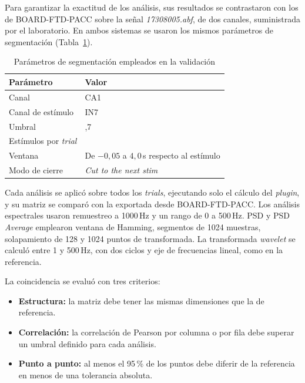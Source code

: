 \documentclass[12pt,letterpaper,oneside]{article}
\begin{document}
Para garantizar la exactitud de los análisis, sus resultados se contrastaron con los de BOARD-FTD-PACC sobre la señal \textit{17308005.abf}, de dos canales, suministrada por el laboratorio. En ambos sistemas se usaron los mismos parámetros de segmentación (Tabla~\ref{tab:pruebas_segmentacion}).

\begin{table}[H]
\centering
\scriptsize
\renewcommand{\arraystretch}{1.3}
\begin{tabularx}{\textwidth}{|l|>{\raggedright\arraybackslash}X|}
\hline
\textbf{Parámetro} & \textbf{Valor} \\
\hline
Canal & CA1 \\
\hline
Canal de estímulo & IN7 \\
\hline
Umbral & 0,7 \\
\hline
Estímulos por \textit{trial} & 1 \\
\hline
Ventana & De $-0{,}05$ a $4{,}0$\,s respecto al estímulo \\
\hline
Modo de cierre & \textit{Cut to the next stim} \\
\hline
\end{tabularx}
\caption{Parámetros de segmentación empleados en la validación}
\label{tab:pruebas_segmentacion}
\end{table}

Cada análisis se aplicó sobre todos los \textit{trials}, ejecutando solo el cálculo del \textit{plugin}, y su matriz se comparó con la exportada desde BOARD-FTD-PACC. Los análisis espectrales usaron remuestreo a 1000\,Hz y un rango de 0 a 500\,Hz. PSD y PSD \textit{Average} emplearon ventana de Hamming, segmentos de 1024 muestras, solapamiento de 128 y 1024 puntos de transformada. La transformada \textit{wavelet} se calculó entre 1 y 500\,Hz, con dos ciclos y eje de frecuencias lineal, como en la referencia.

La coincidencia se evaluó con tres criterios:

\begin{itemize}
  \item \textbf{Estructura:} la matriz debe tener las mismas dimensiones que la de referencia.
  \item \textbf{Correlación:} la correlación de Pearson por columna o por fila debe superar un umbral definido para cada análisis.
  \item \textbf{Punto a punto:} al menos el 95\,\% de los puntos debe diferir de la referencia en menos de una tolerancia absoluta.
\end{itemize}
\end{document}
